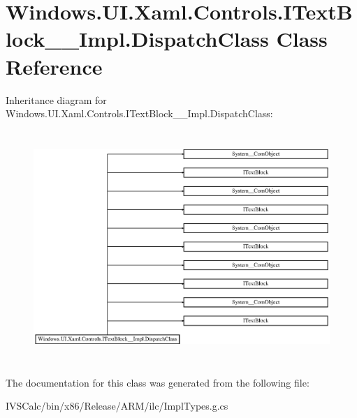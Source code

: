 \hypertarget{class_windows_1_1_u_i_1_1_xaml_1_1_controls_1_1_i_text_block_____impl_1_1_dispatch_class}{}\section{Windows.\+U\+I.\+Xaml.\+Controls.\+I\+Text\+Block\+\_\+\+\_\+\+Impl.\+Dispatch\+Class Class Reference}
\label{class_windows_1_1_u_i_1_1_xaml_1_1_controls_1_1_i_text_block_____impl_1_1_dispatch_class}
Inheritance diagram for Windows.\+U\+I.\+Xaml.\+Controls.\+I\+Text\+Block\+\_\+\+\_\+\+Impl.\+Dispatch\+Class\+:\begin{figure}[H]
\begin{center}
\leavevmode
\includegraphics[height=8.825214cm]{class_windows_1_1_u_i_1_1_xaml_1_1_controls_1_1_i_text_block_____impl_1_1_dispatch_class}
\end{center}
\end{figure}


The documentation for this class was generated from the following file\+:\begin{DoxyCompactItemize}
\item 
I\+V\+S\+Calc/bin/x86/\+Release/\+A\+R\+M/ilc/Impl\+Types.\+g.\+cs\end{DoxyCompactItemize}
